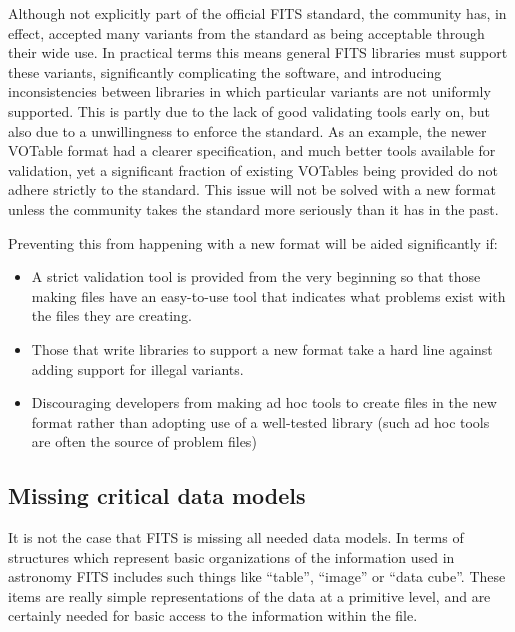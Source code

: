 \documentclass[final,authoryear,5p,times,twocolumn]{elsarticle}
\begin{document}
Although not explicitly part of the official FITS standard, the
community has, in effect, accepted many variants from the standard as
being acceptable through their wide use. In practical terms this means
general FITS libraries must support these variants, significantly
complicating the software, and introducing inconsistencies between
libraries in which particular variants are not uniformly
supported. This is partly due to the lack of good validating tools
early on, but also due to a unwillingness to enforce the standard. As
an example, the newer VOTable format \citep{2004tivo.conf..118O} had a
clearer specification, and much better tools available for validation,
yet a significant fraction of existing VOTables being provided do not
adhere strictly to the standard. This issue will not be solved with a
new format unless the community takes the standard more seriously than
it has in the past.


Preventing this from happening with a new format will be aided significantly if:

\begin{itemize}
\item A strict validation tool is provided from the very beginning so that
those making files have an easy-to-use tool that indicates what
problems exist with the files they are creating.

\item Those that write libraries to support a new format take a hard line
against adding support for illegal variants.

\item Discouraging developers from making ad hoc tools to create files in
the new format rather than adopting use of a well-tested library (such
ad hoc tools are often the source of problem files)
\end{itemize}

\subsection{Missing critical data models}


It is not the case that FITS is missing all needed data models. In
terms of structures which represent basic organizations of the
information used in astronomy FITS includes such things like ``table'',
``image'' or ``data cube''. These items are really simple representations
of the data at a primitive level, and are certainly needed for basic
access to the information within the file.
\end{document}
